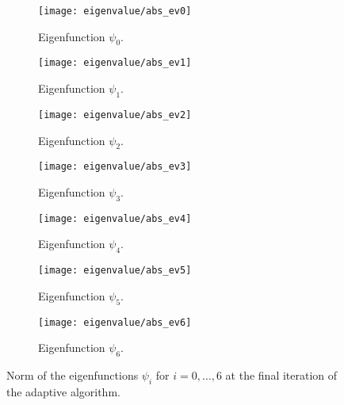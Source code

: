 \begin{figure}[htbp]
    \begin{subfigure}[t]{0.49\textwidth}
        \centering
        \texttt{[image: eigenvalue/abs\_ev0]}
        \caption{Eigenfunction \(\psi_0\).}
        \label{fig:eigenfunction_0}
    \end{subfigure}
    \begin{subfigure}[t]{0.49\textwidth}
        \centering
        \texttt{[image: eigenvalue/abs\_ev1]}
        \caption{Eigenfunction \(\psi_1\).}
        \label{fig:eigenfunction_1}
    \end{subfigure}
    \vspace{1cm}
    \begin{subfigure}[t]{0.49\textwidth}
        \centering
        \texttt{[image: eigenvalue/abs\_ev2]}
        \caption{Eigenfunction \(\psi_2\).}
        \label{fig:eigenfunction_2}
    \end{subfigure}
    \begin{subfigure}[t]{0.49\textwidth}
        \centering
        \texttt{[image: eigenvalue/abs\_ev3]}
        \caption{Eigenfunction \(\psi_3\).}
        \label{fig:eigenfunction_3}
    \end{subfigure}
    \vspace{1cm}
    \begin{subfigure}[t]{0.49\textwidth}
        \centering
        \texttt{[image: eigenvalue/abs\_ev4]}
        \caption{Eigenfunction \(\psi_4\).}
        \label{fig:eigenfunction_4}
    \end{subfigure}
    \begin{subfigure}[t]{0.49\textwidth}
        \centering
        \texttt{[image: eigenvalue/abs\_ev5]}
        \caption{Eigenfunction \(\psi_5\).}
        \label{fig:eigenfunction_5}
    \end{subfigure}
    \vspace{1cm}
    \begin{subfigure}[t]{0.49\textwidth}
        \centering
        \texttt{[image: eigenvalue/abs\_ev6]}
        \caption{Eigenfunction \(\psi_6\).}
        \label{fig:eigenfunction_6}
    \end{subfigure}
    \caption{Norm of the eigenfunctions \(\psi_i\) for \(i = 0, \ldots, 6\) at the final iteration of the adaptive algorithm.}
\end{figure}
